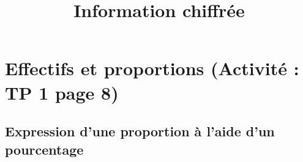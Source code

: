 \documentclass[12pt,a4paper]{article}
\date{}
\title{Information chiffrée }
\begin{document}




\section{Effectifs et proportions (Activité : TP 1 page 8)}


\subsection{Expression d'une proportion à l'aide d'un pourcentage}
\end{document}
